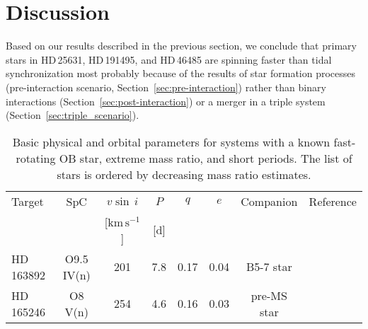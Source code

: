 \documentclass{aa}
\newcommand{\kms}{$\mathrm{km\,s^{-1}}$}
\newcommand{\vsini} {$v\sin\,i$}
\DeclareRobustCommand{\Secref}[1]{Section~\ref{#1}}
\begin{document}
\section{Discussion}
\label{sec:discussions}

Based on our results described in the previous section, we conclude
  that primary stars in HD\,25631, HD\,191495, and HD\,46485 are spinning faster than tidal synchronization most
probably because of the results of star formation processes (pre-interaction scenario, \Secref{sec:pre-interaction}) rather than binary
interactions (\Secref{sec:post-interaction}) or a merger in a triple system (\Secref{sec:triple_scenario}).



\begin{table*}[!htbp]
{\small
\caption{Basic physical and orbital parameters for systems with a known fast-rotating OB star, extreme mass ratio, and short periods. The list of stars is ordered by decreasing mass ratio estimates.}
\label{table:ref_fast}
\begin{tabular}{l |c c c c c c c}
\hline
\hline
Target                  & SpC    &  \vsini  & $P$ & $q$ &
                                                                       $e$  & Companion  & Reference \\
& & [\kms] & [d] & & & & \\
\hline
HD\,163892        &    O9.5 IV(n)       &     201       &    7.8     &  0.17              &   0.04     &  B5-7 star     &   \citet{Mahy_2022}     \\
HD\,165246        &    O8 V(n)          &     254         &    4.6     &  0.16               &   0.03   &  pre-MS star  &   \citet{Johnston2021}       \\

\end{tabular}}
\end{table*}
\end{document}
